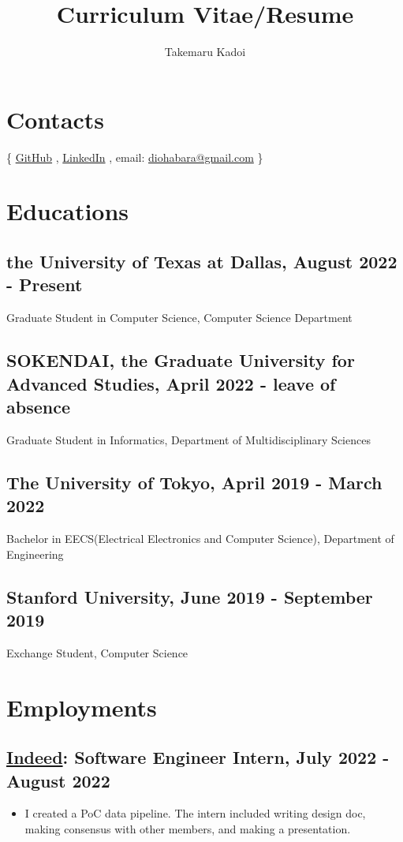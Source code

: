 \documentclass[12pt]{article}
\title{\vspace{-1cm}Curriculum Vitae/Resume}
\author{Takemaru Kadoi}
\date{}
\begin{document}

\section*{Contacts}
  \{
    \href{https://github.com/diohabara/}{GitHub}
    , \href{https://www.linkedin.com/in/takemaru-kadoi}{LinkedIn}
    , email: \href{mailto:diohabara@gmail.com}{diohabara@gmail.com}
  \}

\section*{Educations}
  \subsection*{the University of Texas at Dallas, August 2022 - Present}
    Graduate Student in Computer Science, Computer Science Department
  \subsection*{SOKENDAI, the Graduate University for Advanced Studies, April 2022 - leave of absence}
    Graduate Student in Informatics, Department of Multidisciplinary Sciences
  \subsection*{The University of Tokyo, April 2019 - March 2022}
    Bachelor in EECS(Electrical Electronics and Computer Science), Department of Engineering
  \subsection*{Stanford University, June 2019 - September 2019}
    Exchange Student, Computer Science

\section*{Employments}
  \subsection*{\href{https://www.indeed.com/about}{Indeed}: Software Engineer Intern, July 2022 - August 2022}
    \begin{itemize}
      \item I created a PoC data pipeline. The intern included writing design doc, making consensus with other members, and making a presentation.
    \end{itemize}
\end{document}
